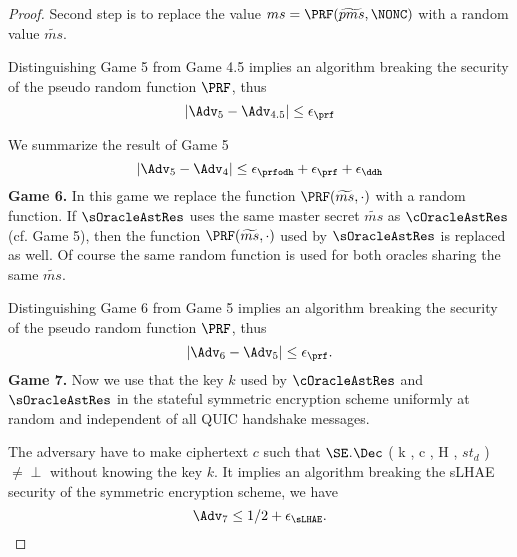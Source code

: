 \begin{proof}
 Second step is to replace the value $ms = \PRF(\widetilde{pms}, \NONC)$ with a random value $\widetilde{ms}$.

 Distinguishing Game 5 from Game 4.5 implies an algorithm breaking the security of the pseudo random function $\PRF$, thus
 \begin{equation}
  |\Adv_{5} - \Adv_{4.5}| \leq \epsilon_{\prf}
 \end{equation}%

 We summarize the result of Game 5
 \begin{equation}
  |\Adv_{5} - \Adv_{4}| \leq \epsilon_{\prfodh} + \epsilon_{\prf} + \epsilon_{\ddh}
 \end{equation}%
%
%
 \textbf{Game 6.} In this game we replace the function $\PRF(\widetilde{ms},\cdot)$ with a random function. If $\sOracleAstRes$ uses the same master secret $\widetilde{ms}$ as $\cOracleAstRes$ (cf. Game 5), then the function $\PRF(\widetilde{ms},\cdot)$ used by $\sOracleAstRes$ is replaced as well. Of course the same random function is used for both oracles sharing the same $\widetilde{ms}$.

 Distinguishing Game 6 from Game 5 implies an algorithm breaking the security of the pseudo random function $\PRF$, thus
 \begin{equation}
  |\Adv_6 - \Adv_5| \leq \epsilon_{\prf}.
 \end{equation}%
%
%
 \textbf{Game 7.} Now we use that the key $k$ used by $\cOracleAstRes$ and $\sOracleAstRes$ in the stateful symmetric encryption scheme uniformly at random and independent of all QUIC handshake messages.

 The adversary have to make ciphertext $c$ such that $\SE$.$\Dec$ ( k , c , H , $st_d$ ) $\neq \perp$ without knowing the key $k$. It implies an algorithm breaking the sLHAE security of the symmetric encryption scheme, we have
 \begin{equation}
  \Adv_7 \leq 1/2 + \epsilon_{\sLHAE}.
 \end{equation}%
\end{proof}